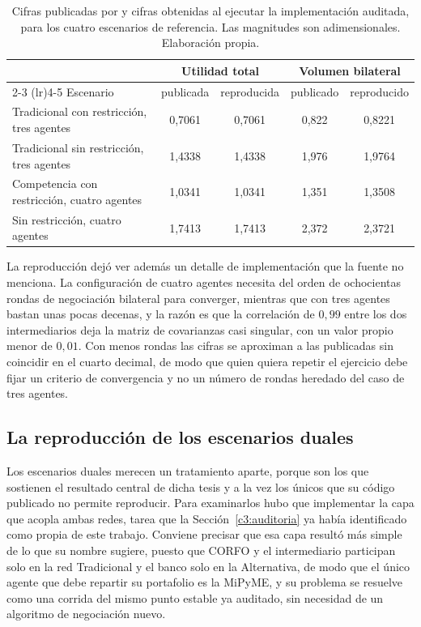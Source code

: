\begin{table}[H]
    \centering
    \small
    \caption[Reproducción de los cuatro escenarios de referencia]{Cifras
    publicadas por  y cifras obtenidas al
    ejecutar la implementación auditada, para los cuatro escenarios de
    referencia. Las magnitudes son adimensionales. Elaboración propia.}
    \label{tab:reproduccion-escenarios}
    \begin{tabular}{p{4.6cm}cccc}
        \toprule
         & \multicolumn{2}{c}{Utilidad total} & \multicolumn{2}{c}{Volumen bilateral} \\
        \cmidrule(lr){2-3} \cmidrule(lr){4-5}
        Escenario & publicada & reproducida & publicado & reproducido \\
        \midrule
        Tradicional con restricción, tres agentes & 0,7061 & 0,7061 & 0,822 & 0,8221 \\
        Tradicional sin restricción, tres agentes & 1,4338 & 1,4338 & 1,976 & 1,9764 \\
        Competencia con restricción, cuatro agentes & 1,0341 & 1,0341 & 1,351 & 1,3508 \\
        Sin restricción, cuatro agentes & 1,7413 & 1,7413 & 2,372 & 2,3721 \\
        \bottomrule
    \end{tabular}
\end{table}

La reproducción dejó ver además un detalle de implementación que la fuente no
menciona. La configuración de cuatro agentes necesita del orden de ochocientas
rondas de negociación bilateral para converger, mientras que con tres agentes
bastan unas pocas decenas, y la razón es que la correlación de $0,99$ entre los
dos intermediarios deja la matriz de covarianzas casi singular, con un valor
propio menor de $0,01$. Con menos rondas las cifras se aproximan a las
publicadas sin coincidir en el cuarto decimal, de modo que quien quiera repetir
el ejercicio debe fijar un criterio de convergencia y no un número de rondas
heredado del caso de tres agentes.

\subsection{La reproducción de los escenarios duales}
\label{c4:venegas-dual}

Los escenarios duales merecen un tratamiento aparte, porque son los que sostienen
el resultado central de dicha tesis y a la vez los únicos que su código publicado
no permite reproducir. Para examinarlos hubo que implementar la capa que acopla
ambas redes, tarea que la Sección~\ref{c3:auditoria} ya había identificado como
propia de este trabajo. Conviene precisar que esa capa resultó más simple de lo
que su nombre sugiere, puesto que CORFO y el intermediario participan solo en la
red Tradicional y el banco solo en la Alternativa, de modo que el único agente
que debe repartir su portafolio es la MiPyME, y su problema se resuelve como una
corrida del mismo punto estable ya auditado, sin necesidad de un algoritmo de
negociación nuevo.

